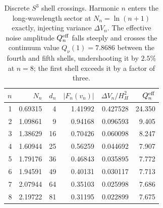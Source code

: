 \begin{table}[htbp]\centering\small
\setlength{\tabcolsep}{4pt}
\begin{tabular}{r r r r r r}
\hline
$n$ & $N_n$ & $d_n$ & $|F_n(v_n)|$ & $\Delta V_n/H_H^2$ & $Q_n^{\rm eff}$ \\
\hline
1 & 0.69315 & 4 & 1.41992 & 0.427528 & 24.350 \\
2 & 1.09861 & 9 & 0.94168 & 0.096593 & 9.405 \\
3 & 1.38629 & 16 & 0.70426 & 0.060098 & 8.247 \\
4 & 1.60944 & 25 & 0.56259 & 0.044692 & 7.907 \\
5 & 1.79176 & 36 & 0.46843 & 0.035895 & 7.772 \\
6 & 1.94591 & 49 & 0.40131 & 0.030117 & 7.713 \\
7 & 2.07944 & 64 & 0.35103 & 0.025998 & 7.686 \\
8 & 2.19722 & 81 & 0.31195 & 0.022899 & 7.675 \\
\hline
\end{tabular}
\caption{Discrete $S^3$ shell crossings. Harmonic $n$ enters the long-wavelength sector at $N_n=\ln(n+1)$ exactly, injecting variance $\Delta V_n$. The effective noise amplitude $Q_n^{\rm eff}$ falls steeply and crosses the continuum value $Q_\nu(1)=7.8686$ between the fourth and fifth shells, undershooting it by $2.5\%$ at $n=8$; the first shell exceeds it by a factor of three.}
\label{tab:shells}
\end{table}
